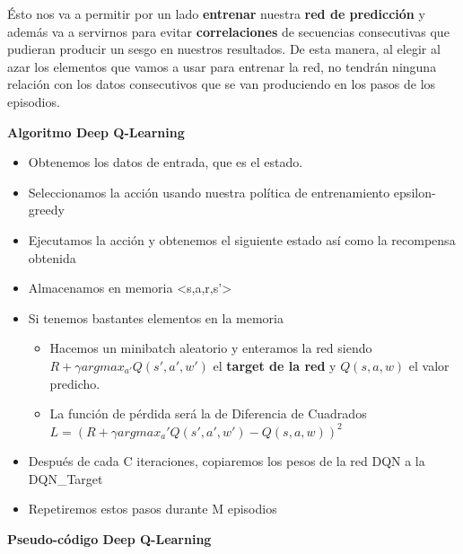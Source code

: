 \documentclass[
  a4paper,
  DIV=11,
  numbers=noendperiod]{scrreprt}
\providecommand{\tightlist}{%
  \setlength{\itemsep}{0pt}\setlength{\parskip}{0pt}}\usepackage{longtable,booktabs,array}
\begin{document}
Ésto nos va a permitir por un lado \textbf{entrenar} nuestra \textbf{red
de predicción} y además va a servirnos para evitar
\textbf{correlaciones} de secuencias consecutivas que pudieran producir
un sesgo en nuestros resultados. De esta manera, al elegir al azar los
elementos que vamos a usar para entrenar la red, no tendrán ninguna
relación con los datos consecutivos que se van produciendo en los pasos
de los episodios.

\textbf{Algoritmo Deep Q-Learning}

\begin{itemize}
\tightlist
\item
  Obtenemos los datos de entrada, que es el estado.
\item
  Seleccionamos la acción usando nuestra política de entrenamiento
  epsilon-greedy
\item
  Ejecutamos la acción y obtenemos el siguiente estado así como la
  recompensa obtenida
\item
  Almacenamos en memoria \textless s,a,r,s'\textgreater{}
\item
  Si tenemos bastantes elementos en la memoria

  \begin{itemize}
  \tightlist
  \item
    Hacemos un minibatch aleatorio y enteramos la red siendo
    \(R+\gamma argmax_{a'}Q(s',a',w')\) el \textbf{target de la red} y
    \(Q(s,a,w)\) el valor predicho.
  \item
    La función de pérdida será la de Diferencia de Cuadrados
    \(L = (R+\gamma argmax_a'Q(s',a',w')-Q(s,a,w))^2\)
  \end{itemize}
\item
  Después de cada C iteraciones, copiaremos los pesos de la red DQN a la
  DQN\_Target
\item
  Repetiremos estos pasos durante M episodios
\end{itemize}

\textbf{Pseudo-código Deep Q-Learning}
\end{document}
